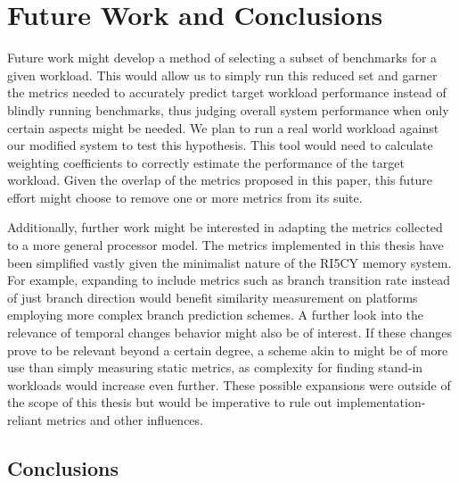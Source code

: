 \documentclass[../bachelor_paper.tex]{subfiles}
\begin{document}
\chapter{Future Work and Conclusions}
    \label{ch:future-conc}
Future work might develop a method of selecting a subset of benchmarks for a given workload. This would allow us to simply run this reduced set and garner the metrics needed to accurately predict target workload performance instead of blindly running benchmarks, thus judging overall system performance when only certain aspects might be needed. We plan to run a real world workload against our modified system to test this hypothesis. This tool would need to calculate weighting coefficients to correctly estimate the performance of the target workload. Given the overlap of the metrics proposed in this paper, this future effort might choose to remove one or more metrics from its suite.

Additionally, further work might be interested in adapting the metrics collected to a more general processor model. The metrics implemented in this thesis have been simplified vastly given the minimalist nature of the RI5CY memory system. For example, expanding to include metrics such as branch transition rate \cite{haungsBranchTransitionRate2000} instead of just branch direction would benefit similarity measurement on platforms employing more complex branch prediction schemes. A further look into the relevance of temporal changes behavior might also be of interest. If these changes prove to be relevant beyond a certain degree, a scheme akin to \cite{joshiDistillingEssenceProprietary2008} might be of more use than simply measuring static metrics, as complexity for finding stand-in workloads would increase even further. These possible expansions were outside of the scope of this thesis but would be imperative to rule out implementation-reliant metrics and other influences.

\section{Conclusions}
    \label{sec:fut/conc}
    
\end{document}
